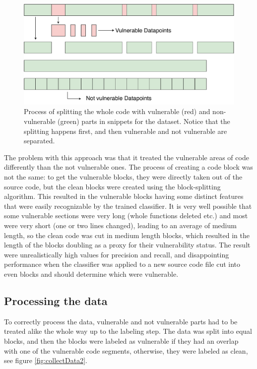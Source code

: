 \documentclass[
a4paper,
pagesize,
pdftex,
12pt,
ngerman,
fleqn,
final,
]{scrartcl}
\begin{document}
	\begin{figure}[ht]
		\centering
		\includegraphics[width=0.8\linewidth]{img/collectData1}
		\caption{Process of splitting the whole code with vulnerable (red) and non-vulnerable (green) parts in snippets for the dataset. Notice that the splitting happens first, and then vulnerable and not vulnerable are separated.}
		\label{fig:collectData1}
	\end{figure}
	
	The problem with this approach was that it treated the vulnerable areas of code differently than the not vulnerable ones. The process of creating a code block was not the same: to get the vulnerable blocks, they were directly taken out of the source code, but the clean blocks were created using the block-splitting algorithm. This resulted in the vulnerable blocks having some distinct features that were easily recognizable by the trained classifier. It is very well possible that some vulnerable sections were very long (whole functions deleted etc.) and most were very short (one or two lines changed), leading to an average of medium length, so the clean code was cut in medium length blocks, which resulted in the length of the blocks doubling as a proxy for their vulnerability status. The result were unrealistically high values for precision and recall, and disappointing performance when the classifier was applied to a new source code file cut into even blocks and should determine which were vulnerable.\\
	
	\subsection{Processing the data}\label{Processing}
	To correctly process the data, vulnerable and not vulnerable parts had to be treated alike the whole way up to the labeling step. The data was split into equal blocks, and then the blocks were labeled as vulnerable if they had an overlap with one of the vulnerable code segments, otherwise, they were labeled as clean, see figure \ref{fig:collectData2}.
	
\end{document}
